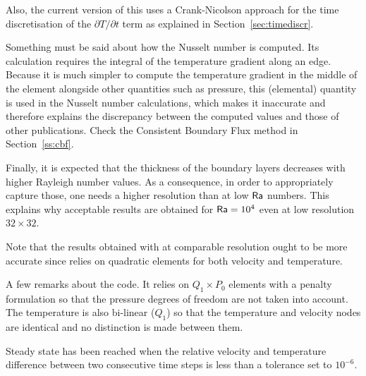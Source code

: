 Also, the current version of this \stone uses a Crank-Nicolson approach for the 
time discretisation of the $\partial T/\partial t$ term as explained in Section~\ref{sec:timediscr}.

Something must be said about how the Nusselt number is computed. 
Its calculation requires the integral of the temperature gradient along an edge. 
Because it is much simpler to compute the temperature gradient in the middle of the 
element alongside other quantities such as pressure, this (elemental) quantity is 
used in the Nusselt number calculations, which makes it inaccurate and therefore 
explains the discrepancy between the computed values and those of other publications.
Check the Consistent Boundary Flux method in Section~\ref{ss:cbf}.

Finally, it is expected that the thickness of the 
boundary layers decreases with higher Rayleigh number values.
As a consequence, in order to appropriately capture those, one needs 
a higher resolution than at low ${\mathsf{Ra}}$ numbers. This explains why 
acceptable results are obtained for ${\mathsf{Ra}}=10^4$  even at low resolution $32\times 32$.

Note that the results obtained with \aspect at comparable resolution ought to be 
more accurate since \aspect relies on quadratic elements for both velocity and 
temperature. 

A few remarks about the code. It relies on $Q_1\times P_0$ elements with a penalty
formulation so that the pressure degrees of freedom are not taken into account. 
The temperature is also bi-linear ($Q_1$) so that the temperature and velocity nodes 
are identical and no distinction is made between them.

Steady state has been reached when the relative velocity and temperature difference between two consecutive 
time steps is less than a tolerance set to $10^{-6}$. 


\newpage
